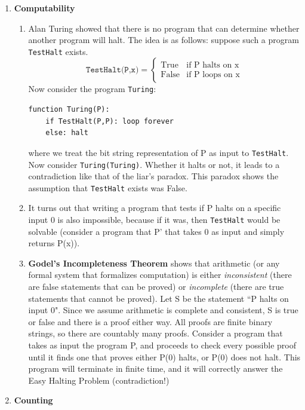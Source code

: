 \documentclass[10pt]{article}
\begin{document}
\begin{multicols}{2}
\begin{enumerate}
\begin{enumerate}
        \end{enumerate}
        \item \textbf{Computability}
        \begin{enumerate}
            \item Alan Turing showed that there is no program that can determine whether another program will halt. The idea is as follows: suppose such a program \texttt{TestHalt} exists.
            \[ \texttt{TestHalt(P,x)} =
            \begin{cases} 
                  \text{True} & \text{if P halts on x} \\
                  \text{False} & \text{if P loops on x} 
               \end{cases}
            \]
            Now consider the program \texttt{Turing}:
        \begin{verbatim}
function Turing(P):
    if TestHalt(P,P): loop forever
    else: halt
            \end{verbatim}
            where we treat the bit string representation of P as input to \texttt{TestHalt}. Now consider \texttt{Turing(Turing)}. Whether it halts or not, it leads to a contradiction like that of the liar's paradox. This paradox shows the assumption that \texttt{TestHalt} exists was False. 
            \item It turns out that writing a program that tests if P halts on a specific input 0 is also impossible, because if it was, then \texttt{TestHalt} would be solvable (consider a program that P' that takes 0 as input and simply returns P(x)).
            \item \textbf{Godel's Incompleteness Theorem} shows that arithmetic (or any formal system that formalizes computation) is either \textit{inconsistent} (there are false statements that can be proved) or \textit{incomplete} (there are true statements that cannot be proved). Let S be the statement ``P halts on input 0". Since we assume arithmetic is complete and consistent, S is true or false and there is a proof either way. All proofs are finite binary strings, so there are countably many proofs. Consider a program that takes as input the program P, and proceeds to check every possible proof until it finds one that proves either P(0) halts, or P(0) does not halt. This program will terminate in finite time, and it will correctly answer the Easy Halting Problem (contradiction!)
        \end{enumerate}
        \item \textbf{Counting}

\end{enumerate}
\end{multicols}
\end{document}
